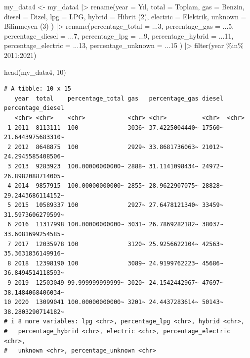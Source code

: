 \documentclass[
  11pt,
  a4paper,
  DIV=11,
  numbers=noendperiod]{scrartcl}
\newenvironment{Shaded}{\begin{snugshade}}{\end{snugshade}}
\newcommand{\AttributeTok}[1]{\textcolor[rgb]{0.40,0.45,0.13}{#1}}
\newcommand{\DecValTok}[1]{\textcolor[rgb]{0.68,0.00,0.00}{#1}}
\newcommand{\FunctionTok}[1]{\textcolor[rgb]{0.28,0.35,0.67}{#1}}
\newcommand{\NormalTok}[1]{\textcolor[rgb]{0.00,0.23,0.31}{#1}}
\newcommand{\OtherTok}[1]{\textcolor[rgb]{0.00,0.23,0.31}{#1}}
\newcommand{\SpecialCharTok}[1]{\textcolor[rgb]{0.37,0.37,0.37}{#1}}
\newcommand{\StringTok}[1]{\textcolor[rgb]{0.13,0.47,0.30}{#1}}
\begin{document}
\begin{Shaded}
\begin{Highlighting}[]
\NormalTok{my\_data4 }\OtherTok{\textless{}{-}}\NormalTok{ my\_data4 }\SpecialCharTok{|\textgreater{}}
  \FunctionTok{rename}\NormalTok{(}\AttributeTok{year =}\NormalTok{ Yıl,}
         \AttributeTok{total =}\NormalTok{ Toplam,}
         \AttributeTok{gas =}\NormalTok{ Benzin,}
         \AttributeTok{diesel =}\NormalTok{ Dizel,}
         \AttributeTok{lpg =}\NormalTok{ LPG,}
         \AttributeTok{hybrid =} \StringTok{\textasciigrave{}}\AttributeTok{Hibrit (2)}\StringTok{\textasciigrave{}}\NormalTok{,}
         \AttributeTok{electric =}\NormalTok{ Elektrik,}
         \AttributeTok{unknown =} \StringTok{\textasciigrave{}}\AttributeTok{Bilinmeyen (3)}\StringTok{\textasciigrave{}}
\NormalTok{  ) }\SpecialCharTok{|\textgreater{}}
  \FunctionTok{rename}\NormalTok{(}\AttributeTok{percentage\_total =}\NormalTok{ ...}\DecValTok{3}\NormalTok{,}
         \AttributeTok{percentage\_gas =}\NormalTok{ ...}\DecValTok{5}\NormalTok{,}
         \AttributeTok{percentage\_diesel =}\NormalTok{ ...}\DecValTok{7}\NormalTok{,}
         \AttributeTok{percentage\_lpg =}\NormalTok{ ...}\DecValTok{9}\NormalTok{,}
         \AttributeTok{percentage\_hybrid =}\NormalTok{ ...}\DecValTok{11}\NormalTok{,}
         \AttributeTok{percentage\_electric =}\NormalTok{ ...}\DecValTok{13}\NormalTok{,}
         \AttributeTok{percentage\_unknown =}\NormalTok{ ...}\DecValTok{15}
\NormalTok{  ) }\SpecialCharTok{|\textgreater{}}
  \FunctionTok{filter}\NormalTok{(year }\SpecialCharTok{\%in\%} \DecValTok{2011}\SpecialCharTok{:}\DecValTok{2021}\NormalTok{)}

\FunctionTok{head}\NormalTok{(my\_data4, }\DecValTok{10}\NormalTok{)}
\end{Highlighting}
\end{Shaded}

\begin{verbatim}
# A tibble: 10 x 15
   year  total    percentage_total gas   percentage_gas diesel percentage_diesel
   <chr> <chr>    <chr>            <chr> <chr>          <chr>  <chr>            
 1 2011  8113111  100              3036~ 37.4225004440~ 17560~ 21.6443975683310~
 2 2012  8648875  100              2929~ 33.8681736063~ 21012~ 24.2945585408506~
 3 2013  9283923  100.00000000000~ 2888~ 31.1141098434~ 24972~ 26.8982088714005~
 4 2014  9857915  100.00000000000~ 2855~ 28.9622907075~ 28828~ 29.2443686114152~
 5 2015  10589337 100              2927~ 27.6478121340~ 33459~ 31.5973606279599~
 6 2016  11317998 100.00000000000~ 3031~ 26.7869282182~ 38037~ 33.6081699254585~
 7 2017  12035978 100              3120~ 25.9256622104~ 42563~ 35.3631836149916~
 8 2018  12398190 100              3089~ 24.9199762223~ 45686~ 36.8494514118593~
 9 2019  12503049 99.999999999999~ 3020~ 24.1542442967~ 47697~ 38.1484068406034~
10 2020  13099041 100.00000000000~ 3201~ 24.4437283614~ 50143~ 38.2803290714182~
# i 8 more variables: lpg <chr>, percentage_lpg <chr>, hybrid <chr>,
#   percentage_hybrid <chr>, electric <chr>, percentage_electric <chr>,
#   unknown <chr>, percentage_unknown <chr>
\end{verbatim}
\end{document}
